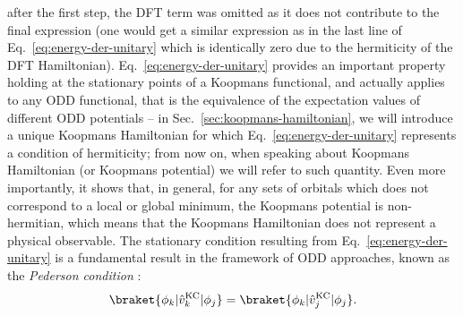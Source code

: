 after the first step, the DFT term was omitted as it does not contribute to the final expression (one would get a similar expression as in the last line of Eq.~\eqref{eq:energy-der-unitary} which is identically zero due to the hermiticity of the DFT Hamiltonian). Eq.~\eqref{eq:energy-der-unitary} provides an important property holding at the stationary points of a Koopmans functional, and actually applies to any ODD functional, that is the equivalence of the expectation values of different ODD potentials -- in Sec.~\ref{sec:koopmans-hamiltonian}, we will introduce a unique Koopmans Hamiltonian for which Eq.~\eqref{eq:energy-der-unitary} represents a condition of hermiticity; from now on, when speaking about Koopmans Hamiltonian (or Koopmans potential) we will refer to such quantity. Even more importantly, it shows that, in general, for any sets of orbitals which does not correspond to a local or global minimum, the Koopmans potential is non-hermitian, which means that the Koopmans Hamiltonian does not represent a physical observable. The stationary condition resulting from Eq.~\eqref{eq:energy-der-unitary} is a fundamental result in the framework of ODD approaches, known as the \emph{Pederson condition} \cite{pederson_localdensity_1984,pederson_densityfunctional_1985}:
%
\begin{equation}
    \braket{\phi_k | \hat{v}^{\rm KC}_k | \phi_j} = \braket{\phi_k | \hat{v}^{\rm KC}_j | \phi_j} .
    \label{eq:pederson-condition}
\end{equation}

